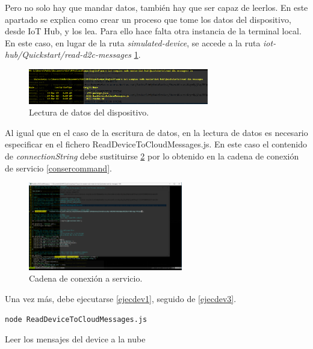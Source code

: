 \documentclass[english,runningheads,a4paper]{llncs}[2018/03/10]
\begin{document}
Pero no solo hay que mandar datos, también hay que ser capaz de leerlos. En este
apartado se explica como crear un proceso que tome los datos del dispositivo,
desde IoT Hub, y los lea. Para ello hace falta otra instancia de la terminal
local. En este caso, en lugar de la ruta \textit{simulated-device}, se accede a
la ruta \textit{iot-hub/Quickstart/read-d2c-messages}
\hyperref[directoryreader]{\ref{directoryreader}}.

\begin{figure}[h!]
 \centering
 \includegraphics[width=0.7\textwidth]{./IoT/MicrosoftAzure/5-1_read_telemetry.png}
 \caption{Lectura de datos del dispositivo.}
 \label{directoryreader}
\end{figure}

Al igual que en el caso de la escritura de datos, en la lectura de datos es
necesario especificar en el fichero ReadDeviceToCloudMessages.js. En este caso
el contenido de \textit{connectionString} debe sustituirse
\hyperref[codestringser]{\ref{codestringser}} por lo obtenido en la cadena de 
conexión de servicio \hyperref[consercommand]{\ref{consercommand}}.

\begin{figure}[h!]
 \centering
 \includegraphics[width=0.6\textwidth]{./IoT/MicrosoftAzure/5-2_read_telemetry.png}
 \caption{Cadena de conexión a servicio.}
 \label{codestringser}
\end{figure}

Una vez más, debe ejecutarse \hyperref[ejecdev1]{\ref{ejecdev1}}, seguido de
\hyperref[ejecdev3]{\ref{ejecdev3}}.


\begin{listing}[htp]
\centering
    \begin{verbatim}
node ReadDeviceToCloudMessages.js
    \end{verbatim}
\caption{Leer los mensajes del device a la nube}
\label{ejecdev3}
\end{listing}
\end{document}
